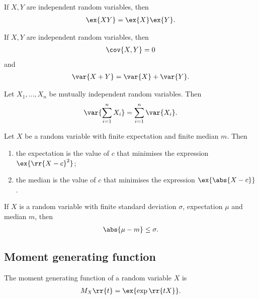 \documentclass{article}
\begin{document}
\begin{theorem}
  If $X,Y$ are independent random variables, then
  \begin{align*}
    \ex{XY}=\ex{X}\ex{Y}.
  \end{align*}
\end{theorem}

\begin{corollary}
  If $X,Y$ are independent random variables, then
  \begin{align*}
    \cov{X,Y}=0
  \end{align*}
  and
  \begin{align*}
    \var{X+Y}=\var{X}+\var{Y}.
  \end{align*}
\end{corollary}

\begin{theorem}
  Let $X_1,...,X_n$ be mutually independent random variables. Then
  \begin{align*}
    \var{\sum_{i=1}^{n} X_i}=\sum_{i=1}^{n} \var{X_i}.
  \end{align*}
\end{theorem}

\begin{theorem}
  Let $X$ be a random variable with finite expectation and finite median $m$. Then
  \begin{enumerate}
    \item the expectation is the value of $c$ that minimises the expression $\ex{\rr{X-c}^2}$;
    \item the median is the value of $c$ that minimises the expression $\ex{\abs{X-c}}$.
  \end{enumerate}
\end{theorem}

\begin{theorem}
  If $X$ is a random variable with finite standard deviation $\sigma$, expectation $\mu$ and
  median $m$, then
  \begin{align*}
    \abs{\mu-m}\leq\sigma.
  \end{align*}
\end{theorem}

\subsection{Moment generating function}\label{sec:moment-generating-function}

\begin{definition}\label{def:moment-generating-function}
  The moment generating function of a random variable $X$ is
  \begin{align*}
    M_X\rr{t}=\ex{\exp\rr{tX}}.
  \end{align*}
\end{definition}
\end{document}
